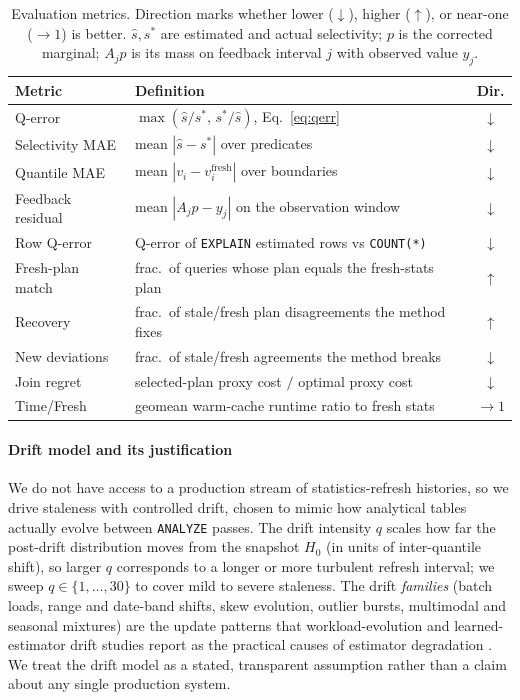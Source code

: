 \documentclass[preprint,12pt]{elsarticle}
\begin{document}
\begin{table}[t]
  \centering\small
  \caption{Evaluation metrics. Direction marks whether lower ($\downarrow$), higher
  ($\uparrow$), or near-one ($\to 1$) is better. $\hat s,s^\ast$ are estimated and actual
  selectivity; $p$ is the corrected marginal; $A_j p$ is its mass on feedback interval
  $j$ with observed value $y_j$.}
  \label{tab:metrics}
  \setlength{\tabcolsep}{5pt}
  \begin{tabular}{l l c}
    \toprule
    Metric & Definition & Dir. \\
    \midrule
    Q-error & $\max(\hat s/s^\ast,\, s^\ast/\hat s)$, Eq.~\eqref{eq:qerr} & $\downarrow$ \\
    Selectivity MAE & mean $|\hat s - s^\ast|$ over predicates & $\downarrow$ \\
    Quantile MAE & mean $|v_i - v_i^{\text{fresh}}|$ over boundaries & $\downarrow$ \\
    Feedback residual & mean $|A_j p - y_j|$ on the observation window & $\downarrow$ \\
    Row Q-error & Q-error of \texttt{EXPLAIN} estimated rows vs \texttt{COUNT(*)} & $\downarrow$ \\
    Fresh-plan match & frac.\ of queries whose plan equals the fresh-stats plan & $\uparrow$ \\
    Recovery & frac.\ of stale/fresh plan disagreements the method fixes & $\uparrow$ \\
    New deviations & frac.\ of stale/fresh agreements the method breaks & $\downarrow$ \\
    Join regret & selected-plan proxy cost $/$ optimal proxy cost & $\downarrow$ \\
    Time/Fresh & geomean warm-cache runtime ratio to fresh stats & $\to 1$ \\
    \bottomrule
  \end{tabular}
\end{table}

\paragraph{Drift model and its justification}
We do not have access to a production stream of statistics-refresh histories, so we drive
staleness with controlled drift, chosen to mimic how analytical tables actually evolve
between \texttt{ANALYZE} passes. The drift intensity $q$ scales how far the post-drift
distribution moves from the snapshot $H_0$ (in units of inter-quantile shift), so larger
$q$ corresponds to a longer or more turbulent refresh interval; we sweep
$q\in\{1,\dots,30\}$ to cover mild to severe staleness. The drift \emph{families}
(batch loads, range and date-band shifts, skew evolution, outlier bursts, multimodal and
seasonal mixtures) are the update patterns that workload-evolution and learned-estimator
drift studies report as the practical causes of estimator degradation
\cite{li2022warper,negi2023robust,lee2023impact,han2024bytecard}. We treat the drift model
as a stated, transparent assumption rather than a claim about any single production system.
\end{document}
